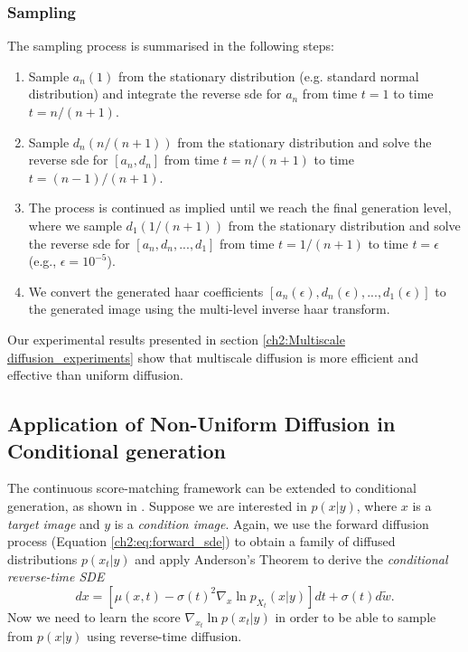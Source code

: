 \subsubsection{Sampling}
The sampling process is summarised in the following steps:

\begin{enumerate}
    \item  Sample $a_n(1)$ from the stationary distribution (e.g. standard normal distribution) and integrate the reverse sde for $a_n$ from time $t=1$ to time $t=n/(n+1)$. 
    \item Sample $d_n(n/(n+1))$ from the stationary distribution and solve the reverse sde for $[a_n, d_n]$ from time $t=n/(n+1)$ to time $t=(n-1)/(n+1)$.
    \item The process is continued as implied until we reach the final generation level, where we sample $d_1(1/(n+1))$ from the stationary distribution and solve the reverse sde for $[a_n,d_n,...,d_1]$ from time $t=1/(n+1)$ to time $t=\epsilon$ (e.g., $\epsilon=10^{-5}$). 
    \item We convert the generated haar coefficients $[a_n(\epsilon),d_n(\epsilon),...,d_1(\epsilon)]$ to the generated image using the multi-level inverse haar transform.
\end{enumerate}

Our experimental results presented in section \ref{ch2:Multiscale diffusion_experiments} show that multiscale diffusion is more efficient and effective than uniform diffusion.


\subsection{Application of Non-Uniform Diffusion in Conditional generation} \label{ch2:sec:conditional_generation}

The continuous score-matching framework can be extended to conditional generation, as shown in  \cite{song2021sde}. Suppose we are interested in $p(x|y)$, where $x$ is a \textit{target image} and $y$ is a \textit{condition image}. Again, we use the forward diffusion process (Equation \ref{ch2:eq:forward_sde}) to obtain a family of diffused distributions $p(x_t | y)$ and apply Anderson's Theorem to derive the \textit{conditional reverse-time SDE}
\begin{equation}
    \label{ch2:eq:conditional_reverse_sde}
    dx = [\mu(x,t) - \sigma(t)^2 \nabla_{x} \ln p_{X_t}(x | y)]dt + \sigma(t)d\tilde{w}.
\end{equation}
Now we need to learn the score $\nabla_{x_t} \ln p(x_t|y)$ in order to be able to sample from $p(x | y)$ using reverse-time diffusion.\\

